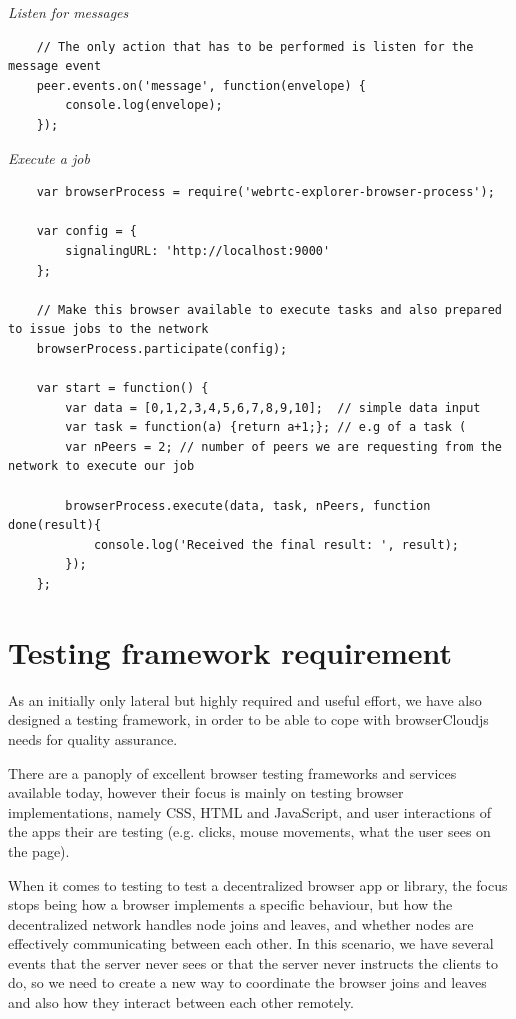 \textit{Listen for messages}
\begingroup
\scriptsize
\begin{verbatim}
    // The only action that has to be performed is listen for the message event
    peer.events.on('message', function(envelope) {
        console.log(envelope);
    });
\end{verbatim}
\endgroup

\textit{Execute a job}
\begingroup
\scriptsize
\begin{verbatim}
    var browserProcess = require('webrtc-explorer-browser-process');

    var config = {
        signalingURL: 'http://localhost:9000'
    };

    // Make this browser available to execute tasks and also prepared to issue jobs to the network
    browserProcess.participate(config);

    var start = function() {
        var data = [0,1,2,3,4,5,6,7,8,9,10];  // simple data input
        var task = function(a) {return a+1;}; // e.g of a task (
        var nPeers = 2; // number of peers we are requesting from the network to execute our job

        browserProcess.execute(data, task, nPeers, function done(result){
            console.log('Received the final result: ', result);
        });
    };
\end{verbatim}
\endgroup

\section{Testing framework requirement}

As an initially only lateral but highly required and useful effort, we have also designed a testing framework, in order to be able to cope with browserCloudjs needs for quality assurance.

There are a panoply of excellent browser testing frameworks and services available today, however their focus is mainly on testing browser implementations, namely CSS, HTML and JavaScript, and user interactions of the apps their are testing (e.g. clicks, mouse movements, what the user sees on the page).

When it comes to testing to test a decentralized browser app or library, the focus stops being how a browser implements a specific behaviour, but how the decentralized network handles node joins and leaves, and whether nodes are effectively communicating between each other. In this scenario, we have several events that the server never sees or that the server never instructs the clients to do, so we need to create a new way to coordinate the browser joins and leaves and also how they interact between each other remotely.

